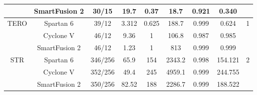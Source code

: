 \begin{table}[htbp]
{\begin{tabular}{|c|c|c|c|c|c|c|c|c|}
                                  & SmartFusion 2 & 30/15 & 19.7  & 0.37  & 18.7  & 0.921 & 0.340 &  \\
                            \hline
                            \multirow{3}[2]{*}{TERO} & Spartan 6 & 39/12 & 3.312 & 0.625 & 188.7 & 0.999 & 0.624 & \multirow{3}[2]{*}{1} \\
                                  & Cyclone V & 46/12 & 9.36  & 1     & 106.8 & 0.987 & 0.985 &  \\
                                  & SmartFusion 2 & 46/12 & 1.23  & 1     & 813   & 0.999 & 0.999 &  \\
                            \hline
                            \multirow{3}[2]{*}{STR} & Spartan 6 & 346/256 & 65.9  & 154   & 2343.2 & 0.998 & 154.121 & \multirow{3}[2]{*}{2} \\
                                  & Cyclone V & 352/256 & 49.4  & 245   & 4959.1 & 0.999 & 244.755 &  \\
                                  & SmartFusion 2 & 350/256 & 82.52 & 188   & 2286.7 & 0.999 & 188.522 &  \\
                            \hline
                        \end{tabular}%
                    }
                  \label{tab:resumen_de_trng_cores}
                \end{table}%

